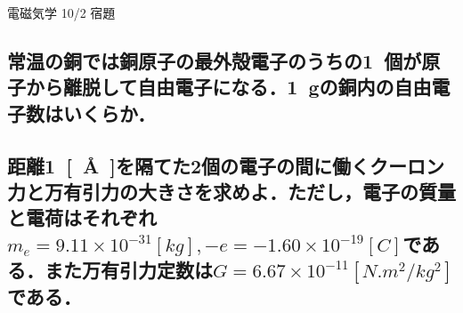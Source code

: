 \documentclass[a4j,12pt]{jsarticle}
\begin{document}
\begin{center}
    \begin{LARGE}
        {\huge 電磁気学 10/2 宿題} 
    \end{LARGE}
\end{center}

\subsection{常温の銅では銅原子の最外殻電子のうちの\SI{1}{個}が原子から離脱して自由電子になる．\SI{1}{g}の銅内の自由電子数はいくらか．}

\vspace{20em}
\subsection{距離\SI{1}{[\AA]}を隔てた2個の電子の間に働くクーロン力と万有引力の大きさを求めよ．ただし，電子の質量と電荷はそれぞれ \(m_e=9.11\times10^{-31}[\si{kg}], -e=-1.60\times10^{-19}[\si{C}]\)である．また万有引力定数は\(G=6.67\times10^{-11}[\si{N.m^2/kg^2}]\)である．}
\end{document}
